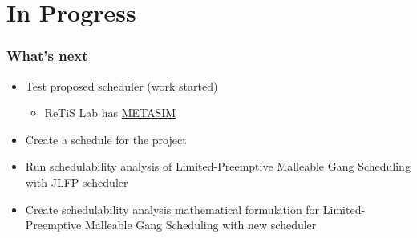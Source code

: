 \documentclass[pdf]{beamer}
\begin{document}
\section{In Progress}

\begin{frame}
    \frametitle{What's next}

    \begin{itemize}
        \item Test proposed scheduler (work started)
        \begin{itemize}
            \item ReTiS Lab has \href{https://github.com/ReTiS-Lab/METASIM}{METASIM}
        \end{itemize}
        \item Create a schedule for the project
        \item Run schedulability analysis of Limited-Preemptive Malleable Gang Scheduling with JLFP scheduler
        \item Create schedulability analysis mathematical formulation for Limited-Preemptive Malleable Gang Scheduling with new scheduler
    \end{itemize}
    
\end{frame}
\end{document}
